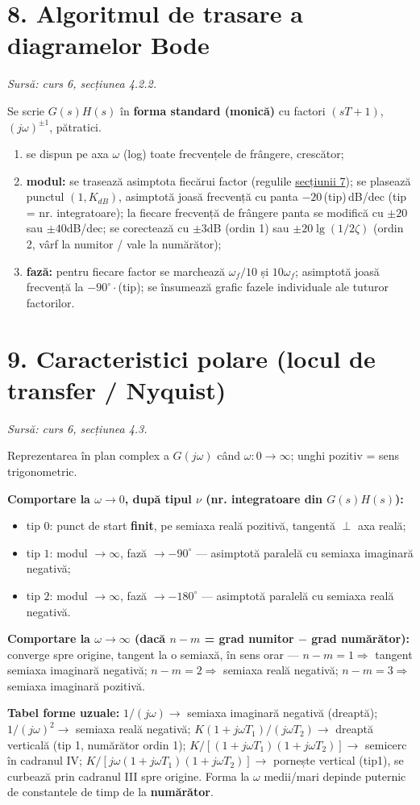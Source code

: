 \documentclass[10pt,a4paper]{article}
\newcommand{\srcnote}[1]{{\footnotesize\color{gray!55!black}\textit{Sursă: #1}}\par}
\begin{document}
\section*{8. Algoritmul de trasare a diagramelor Bode}\label{sec:8}
\srcnote{curs 6, secțiunea 4.2.2.}
Se scrie $G(s)H(s)$ în \textbf{forma standard (monică)} cu factori $(sT+1)$, $(j\omega)^{\pm1}$, pătratici.
\begin{enumerate}
\item se dispun pe axa $\omega$ (log) toate frecvențele de frângere, crescător;
\item \textbf{modul:} se trasează asimptota fiecărui factor (regulile \hyperref[sec:7]{secțiunii 7}); se plasează punctul $(1,K_{dB})$, asimptotă joasă frecvență cu panta $-20\,$(tip)$\,$dB/dec (tip = nr. integratoare); la fiecare frecvență de frângere panta se modifică cu $\pm20$ sau $\pm40$dB/dec; se corectează cu $\pm3$dB (ordin 1) sau $\pm20\lg(1/2\zeta)$ (ordin 2, vârf la numitor / vale la numărător);
\item \textbf{fază:} pentru fiecare factor se marchează $\omega_f/10$ și $10\omega_f$; asimptotă joasă frecvență la $-90^\circ\cdot$(tip); se însumează grafic fazele individuale ale tuturor factorilor.
\end{enumerate}

\section*{9. Caracteristici polare (locul de transfer / Nyquist)}\label{sec:9}
\srcnote{curs 6, secțiunea 4.3.}
Reprezentarea în plan complex a $G(j\omega)$ când $\omega:0\to\infty$; unghi pozitiv = sens trigonometric.
\begin{keyeq}\color{red!65!black}
\textbf{Comportare la $\omega\to0$, după tipul $\nu$ (nr. integratoare din $G(s)H(s)$):}
\begin{itemize}
\item tip $0$: punct de start \textbf{finit}, pe semiaxa reală pozitivă, tangentă $\perp$ axa reală;
\item tip $1$: modul $\to\infty$, fază $\to-90^\circ$ — asimptotă paralelă cu semiaxa imaginară negativă;
\item tip $2$: modul $\to\infty$, fază $\to-180^\circ$ — asimptotă paralelă cu semiaxa reală negativă.
\end{itemize}
\textbf{Comportare la $\omega\to\infty$ (dacă $n-m$ = grad numitor $-$ grad numărător):} converge spre origine, tangent la o semiaxă, în sens orar — $n{-}m{=}1\Rightarrow$ tangent semiaxa imaginară negativă; $n{-}m{=}2\Rightarrow$ semiaxa reală negativă; $n{-}m{=}3\Rightarrow$ semiaxa imaginară pozitivă.
\end{keyeq}
\textbf{Tabel forme uzuale:} $1/(j\omega)\to$ semiaxa imaginară negativă (dreaptă); $1/(j\omega)^2\to$ semiaxa reală negativă; $K(1+j\omega T_1)/(j\omega T_2)\to$ dreaptă verticală (tip 1, numărător ordin 1); $K/[(1+j\omega T_1)(1+j\omega T_2)]\to$ semicerc în cadranul IV; $K/[j\omega(1+j\omega T_1)(1+j\omega T_2)]\to$ pornește vertical (tip1), se curbează prin cadranul III spre origine. Forma la $\omega$ medii/mari depinde puternic de constantele de timp de la \textbf{numărător}.
\end{document}
